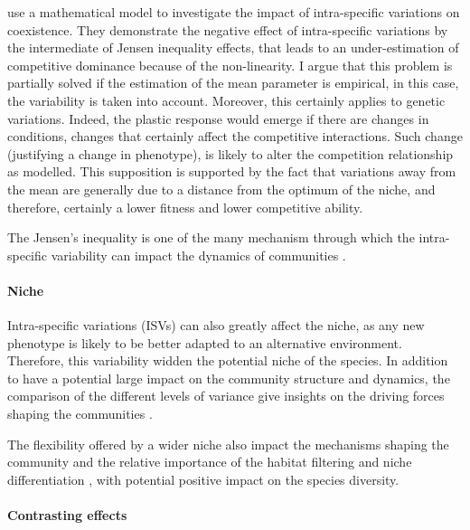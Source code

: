 \cite{hart_how_2016} use a mathematical model to investigate the impact of intra-specific variations on coexistence. They demonstrate the negative effect of intra-specific variations by the intermediate of Jensen inequality effects, that leads to an under-estimation of competitive dominance because of the non-linearity. I argue that this problem is partially solved if the estimation of the mean parameter is empirical, in this case, the variability is taken into account.
Moreover, this certainly applies to genetic variations. Indeed, the plastic response would emerge if there are changes in conditions, changes that certainly affect the competitive interactions. Such change (justifying a change in phenotype), is likely to alter the competition relationship as modelled. This supposition is supported by the fact that variations away from the mean are generally due to a distance from the optimum of the niche, and therefore, certainly a lower fitness and lower competitive ability.

The Jensen's inequality is one of the many mechanism through which the intra-specific variability can impact the dynamics of communities \parencite{bolnick_why_2011}.


\paragraph{Niche}

Intra-specific variations (ISVs) can also greatly affect the niche, as any new phenotype is likely to be better adapted to an alternative environment. Therefore, this variability widden the potential niche of the species. In addition to have a potential large impact on the community structure and dynamics, the comparison of the different levels of variance give insights on the driving forces shaping the communities \parencite{violle_return_2012}.

The flexibility offered by a wider niche also impact the mechanisms shaping the community and the relative importance of the habitat filtering and niche differentiation \cite{jung_intraspecific_2010}, with potential positive impact on the species diversity.
%
%
%


\paragraph{Contrasting effects}

